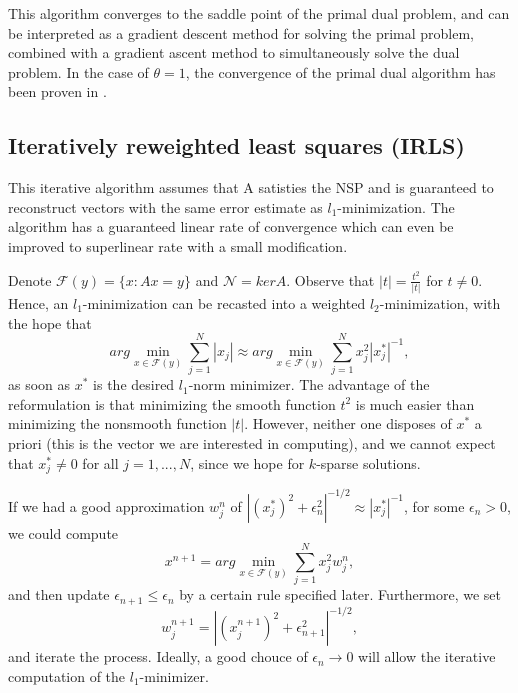 \documentclass[
  english,        %
  font=times,     %
  onecolumn,      %
]{tumarticle}
\numberwithin{equation}{section} %
\begin{document}
\begin{large}
\begin{adjustwidth}{0pt}{0pt}
This algorithm converges to the saddle point of the primal dual problem, and can be interpreted as a gradient descent method for solving the primal problem, combined with a gradient ascent method to simultaneously solve the dual problem. In the case of $\theta = 1$, the convergence of the primal dual algorithm has been proven in \cite{CP}.

\subsection{Iteratively reweighted least squares (IRLS)}

This iterative algorithm assumes that A satisties the NSP and is guaranteed to reconstruct vectors with the same error estimate as $l_1$-minimization. The algorithm has a guaranteed linear rate of convergence which can even be improved to superlinear rate with a small modification.

Denote $\mathcal{F}(y) = \{x : Ax = y\}$ and $\mathcal{N} = ker A$. Observe that $|t| = \frac{t^2}{|t|}$ for $t \neq 0$. Hence, an $l_1$-minimization can be recasted into a weighted $l_2$-minimization, with the hope that
\[ arg \min_{x \in \mathcal{F}(y)} \sum_{j=1}^N |x_j| \approx arg \min_{x \in \mathcal{F}(y)} \sum_{j=1}^N x_j^2 |x_j^*|^{-1} ,\]
as soon as $x^*$ is the desired $l_1$-norm minimizer. The advantage of the reformulation is that minimizing the smooth function $t^2$ is much easier than minimizing the nonsmooth function $|t|$. However, neither one disposes of $x^*$ a priori (this is the vector we are interested in computing), and we cannot expect that $x_j^* \neq 0$ for all $j = 1,...,N$, since we hope for $k$-sparse solutions.

If we had a good approximation $w_j^n$ of $|(x_j^*)^2 + \epsilon_n^2|^{-1/2} 
\approx |x_j^*|^{-1}$, for some $\epsilon_n > 0$, we could compute
\begin{equation} \label{irls:eq1}
x^{n+1} = arg \min_{x \in \mathcal{F}(y)} \sum_{j=1}^N x_j^2 w_j^n ,
\end{equation}
and then update $\epsilon_{n+1} \leq \epsilon_{n}$ by a certain rule specified later. Furthermore, we set
\begin{equation}
\label{irls:eq2} w_j^{n+1} = |(x_j^{n+1})^2 + \epsilon_{n+1}^2|^{-1/2} ,
\end{equation}
and iterate the process. Ideally, a good chouce of $\epsilon_n \rightarrow 0$ will allow the iterative computation of the $l_1$-minimizer.


\end{adjustwidth}
\end{large}
\end{document}
